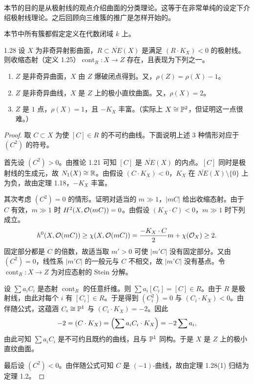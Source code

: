 本节的目的是从极射线的观点介绍曲面的分类理论。这等于在非常单纯的设定下介绍极射线理论。之后回顾向三维簇的推广是怎样开始的。

本节中所有簇都假定定义在代数闭域 $k$ 上。

\begin{theoremp}{1.28}
设 $X$ 为非奇异射影曲面，$R\subset\overline{NE}(X)$ 是满足 $(R\cdot K_X)<0$ 的极射线。则收缩态射（定义 1.25）$\operatorname{cont}_R:X\to Z$ 存在，且表现为下列之一。

\begin{enumerate}
\item $Z$ 是非奇异曲面，$X$ 由 $Z$ 爆破闭点得到。又，$\rho(Z)=\rho(X)-1$。
\item $Z$ 是非奇异曲线，$X$ 是 $Z$ 上的极小直纹曲面。又，$\rho(X)=2$。
\item $Z$ 是 $1$ 点，$\rho(X)=1$，且 $-K_X$ 丰富。（实际上 $X\cong\mathbb{P}^2$，但证明这一点很难。）
\end{enumerate}
\end{theoremp}


\begin{proof}
取 $C\subset X$ 为使 $[C]\in R$ 的不可约曲线。下面说明上述 $3$ 种情形对应于 $(C^2)$ 的符号。

首先设 $(C^2)>0$。由推论 1.21 可知 $[C]$ 是 $\overline{NE}(X)$ 的内点。$[C]$ 同时是极射线的生成元，故 $N_1(X)\cong\mathbb{R}$。由假设 $(C\cdot K_X)<0$，$K_X$ 在 $\overline{NE}(X)\setminus\{0\}$ 上为负，故由定理 1.18，$-K_X$ 丰富。

其次考虑 $(C^2)=0$ 的情形。证明对适当的 $m\gg1$，$|mC|$ 给出收缩态射。由于 $C$ 有效，$m\gg1$ 时 $H^2(X,\mathcal{O}(mC))=0$。由假设 $(K_X\cdot C)<0$，$m\gg1$ 时下列成立。
\[ h^0(X,\mathcal{O}(mC))\ge\chi(X,\mathcal{O}(mC))=\frac{-K_X\cdot C}{2}m+\chi(\mathcal{O}_X)\ge2. \]
固定部分都是 $C$ 的倍数，故适当取 $m'>0$ 可使 $|m'C|$ 没有固定部分。又由 $(C^2)=0$，线性系 $|m'C|$ 的一般元与 $C$ 不相交，故 $|m'C|$ 没有基点。令 $\operatorname{cont}_R:X\to Z$ 为对应态射的 Stein 分解。

设 $\sum a_iC_i$ 是态射 $\operatorname{cont}_R$ 的任意纤维。则 $\sum a_i[C_i]=[C]\in R$。由于 $R$ 是极射线，由此对每个 $i$ 有 $[C_i]\in R$。于是得到 $(C_i^2)=0$ 与 $(C_i\cdot K_X)<0$。由伴随公式，这蕴涵 $C_i\cong\mathbb{P}^1$ 与 $(C_i\cdot K_X)=-2$。因此
\[ -2=(C\cdot K_X)=\Bigl(\sum a_iC_i\cdot K_X\Bigr)=-2\sum a_i, \]
由此可知 $\sum a_iC_i$ 是不可约且既约的曲线，且与 $\mathbb{P}^1$ 同构。于是 $X$ 是 $Z$ 上的极小直纹曲面。

最后设 $(C^2)<0$。由伴随公式可知 $C$ 是 $(-1)$-曲线，故由定理 1.28(1) 归结为定理 1.2。
\end{proof}

